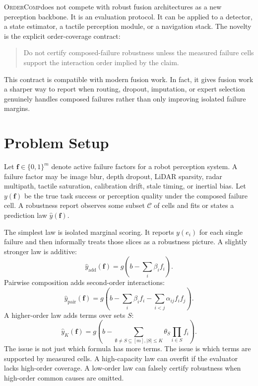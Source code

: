 \documentclass{article}
\newcommand{\method}{\textsc{OrderComp}}
\newcommand{\fvec}{\mathbf{f}}
\newcommand{\yhat}{\hat{y}}
\begin{document}
\method does not compete with robust fusion architectures as a new perception backbone. It is an evaluation protocol. It can be applied to a detector, a state estimator, a tactile perception module, or a navigation stack. The novelty is the explicit order-coverage contract:
\begin{quote}
Do not certify composed-failure robustness unless the measured failure cells support the interaction order implied by the claim.
\end{quote}
This contract is compatible with modern fusion work. In fact, it gives fusion work a sharper way to report when routing, dropout, imputation, or expert selection genuinely handles composed failures rather than only improving isolated failure margins.

\section{Problem Setup}

Let $\fvec \in \{0,1\}^m$ denote active failure factors for a robot perception system. A failure factor may be image blur, depth dropout, LiDAR sparsity, radar multipath, tactile saturation, calibration drift, stale timing, or inertial bias. Let $y(\fvec)$ be the true task success or perception quality under the composed failure cell. A robustness report observes some subset $\mathcal{C}$ of cells and fits or states a prediction law $\yhat(\fvec)$.

The simplest law is isolated marginal scoring. It reports $y(e_i)$ for each single failure and then informally treats those slices as a robustness picture. A slightly stronger law is additive:
\begin{equation}
    \yhat_{\mathrm{add}}(\fvec) = g\!\left(b - \sum_i \beta_i f_i\right).
\end{equation}
Pairwise composition adds second-order interactions:
\begin{equation}
    \yhat_{\mathrm{pair}}(\fvec) = g\!\left(b - \sum_i \beta_i f_i - \sum_{i<j} \alpha_{ij} f_i f_j\right).
\end{equation}
A higher-order law adds terms over sets $S$:
\begin{equation}
    \yhat_{K}(\fvec) = g\!\left(b - \sum_{\emptyset \neq S \subseteq [m], |S|\le K} \theta_S \prod_{i\in S} f_i\right).
\end{equation}
The issue is not just which formula has more terms. The issue is which terms are supported by measured cells. A high-capacity law can overfit if the evaluator lacks high-order coverage. A low-order law can falsely certify robustness when high-order common causes are omitted.
\end{document}
